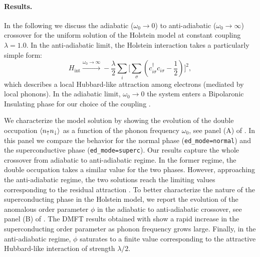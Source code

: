 \documentclass[edipack_sp.tex]{subfiles}
\begin{document}
\paragraph{Results.}
In the following we discuss the adiabatic ($\omega_0\to0$) to
anti-adiabatic ($\omega_0\to\infty$) crossover for
the uniform solution of the Holstein model at constant coupling $\lambda=1.0$.
%
In the anti-adiabatic limit, the Holstein interaction takes a
particularly simple form:
\begin{equation}\label{HlikeAttraction}
    H_\mathrm{int} \overset{ \omega_0 \rightarrow \infty}{ \longrightarrow } -\frac{\lambda}{2} \sum_i \Big[\sum_\sigma\left(c^\dagger_{i\sigma}c_{i\sigma} -\frac{1}{2}\right) \Big]^2,
\end{equation}
which describes a local Hubbard-like attraction among electrons
(mediated by local phonons).
In the  adiabatic limit, $\omega_0 \rightarrow 0$ the system
enters a Bipolaronic Insulating phase for our
choice of the coupling \cite{Capone2006PRB}. 


We characterize the model solution by showing the evolution of the
double occupation $\langle n_{\uparrow}n_{\downarrow}\rangle$ as a function of the
phonon frequency $\omega_0$, see panel (A) of . In this panel we compare
the behavior for the normal phase ({\tt ed\_mode=normal}) and the superconductive
phase ({\tt ed\_mode=superc}). Our results capture the whole
crossover from adiabatic to anti-adiabatic regime. In the former
regime, the double occupation takes a similar value for the two
phases. However, approaching the anti-adiabatic regime, the two
solutions reach the limiting values corresponding to the residual
attraction .   
To better characterize the nature of the superconducting
phase in the Holstein model, we report the evolution of the anomalous order
parameter $\phi$ in the adiabatic to anti-adiabatic crossover, see panel (B) of .
The DMFT results obtained with \NAME show a rapid increase in the
superconducting order parameter as phonon frequency grows
large. Finally, in the anti-adiabatic regime, $\phi$ saturates to a
finite value corresponding to the attractive Hubbard-like interaction
of strength $\lambda/2$. 
\end{document}
